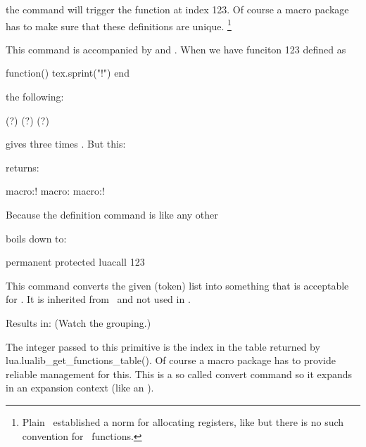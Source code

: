 \starttyping
\luadef{}
\stoptyping

the \type {\foo} command will trigger the function at index 123. Of course a
macro package has to make sure that these definitions are unique. \footnote
{Plain \TEX\ established a norm for allocating registers, like \typ {\newdimen}
but there is no such convention for \LUA\ functions.}

This command is accompanied by  and
. When we have funciton 123 defined as

\starttyping
function() tex.sprint("!") end
\stoptyping

the following:

\starttyping
(\luafunctioncall  \foocode ?)
(\normalluafunction\foocode ?)
(\foo                       ?)
\stoptyping

gives three times . But this:

\starttyping
\edef\oof{\foo                      } \meaning\oof  %
\edef\oof{\luafunctioncall  \foocode} \meaning\oof  %
\edef\oof{\normalluafunction\foocode} \meaning\oof  %
\stoptyping

returns:

\starttyping
macro:!
macro:
macro:!
\stoptyping

Because the definition command is like any other

\starttyping
\permanent\protected\luadef{}
\stoptyping

boils down to:

\starttyping
permanent protected luacall 123
\stoptyping

\stopnewprimitive

\startnewprimitive[title={\prm {luaescapestring}}]

This command converts the given (token) list into something that is acceptable
for \LUA. It is inherited from \LUATEX\ and not used in \CONTEXT.

\startbuffer
{}
\stopbuffer

\typebuffer

Results in: \inlinebuffer\space (Watch the grouping.)

\stopnewprimitive

\startnewprimitive[title={\prm {luafunction}}]

The integer passed to this primitive is the index in the table returned by \typ
{lua.lualib_get_functions_table()}. Of course a macro package has to provide
reliable management for this. This is a so called convert command so it expands
in an expansion context (like an ).

